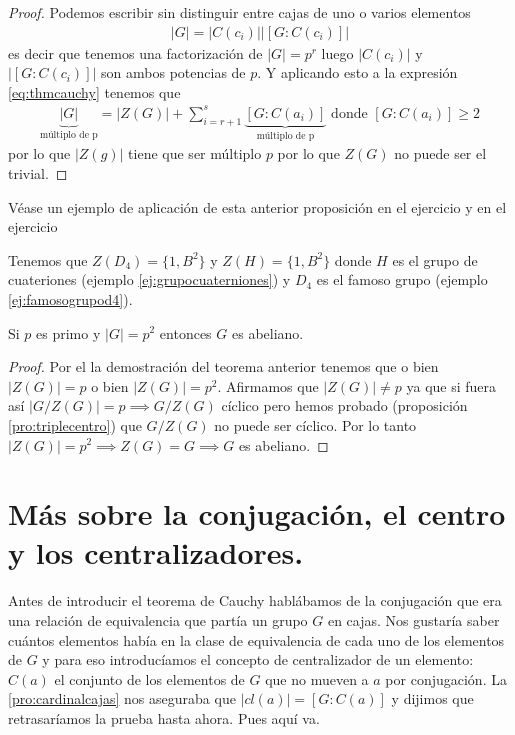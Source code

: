 \begin{proof}
	Podemos escribir sin distinguir entre cajas de uno o varios elementos
	\begin{align*}
	|G| = |C(c_i)||[G:C(c_i)]|
	\end{align*}
	es decir que tenemos una factorización de $|G| = p^r$ luego $|C(c_i)|$ y $|[G:C(c_i)]|$ son ambos potencias de $p$. Y aplicando esto a la expresión \ref{eq:thmcauchy} tenemos que
	\begin{align*}
	\underbrace{|G|}_{\text{múltiplo de p}} = |Z(G)| + \sum_{i = r + 1}^{s} \underbrace{[G : C(a_i)]}_{\text{múltiplo de p}} \text{ donde } [G : C(a_i)] \geq 2
	\end{align*}
	por lo que $|Z(g)|$ tiene que ser múltiplo $p$ por lo que $Z(G)$ no puede ser el trivial.
\end{proof}

Véase un ejemplo de aplicación de esta anterior proposición en el ejercicio  y en el ejercicio 

\begin{ej}
	Tenemos que $Z(D_4) = \{1,B^2\}$ y $Z(H) = \{1, B^2\}$ donde $H$ es el grupo de cuateriones (ejemplo \ref{ej:grupocuaterniones}) y $D_4$ es el famoso grupo (ejemplo \ref{ej:famosogrupod4}). 
\end{ej}

\begin{pro}
	\label{pro:primocuadradoabeliano}
	Si $p$ es primo y $|G| = p^2$ entonces $G$ es abeliano.
\end{pro}

\begin{proof}
	Por el la demostración del teorema anterior tenemos que o bien $|Z(G)| = p$ o bien $|Z(G)| = p^2$. Afirmamos que $|Z(G)| \neq p$ ya que si fuera así $|G/Z(G)| = p \implies G/Z(G)$ cíclico pero hemos probado (proposición \ref{pro:triplecentro}) que $G/Z(G)$ no puede ser cíclico. Por lo tanto $|Z(G)| = p^2 \implies Z(G) = G \implies G$ es abeliano.
\end{proof}


\section{Más sobre la conjugación, el centro y los centralizadores.}
Antes de introducir el teorema de Cauchy hablábamos de la conjugación que era una relación de equivalencia que partía un grupo $G$ en cajas. Nos gustaría saber cuántos elementos había en la clase de equivalencia de cada uno de los elementos de $G$ y para eso introducíamos el concepto de centralizador de un elemento: $C(a)$ el conjunto de los elementos de $G$ que no mueven a $a$ por conjugación. La \autoref{pro:cardinalcajas} nos aseguraba que $|cl(a)| = [G:C(a)]$ y dijimos que retrasaríamos la prueba hasta ahora. Pues aquí va.




